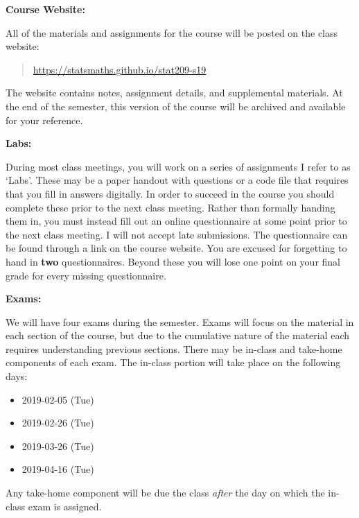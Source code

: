 \documentclass[12pt]{article}
\begin{document}
\bigskip

\textbf{Course Website:} \vspace{6pt}

All of the materials and assignments for the course will be posted
on the class website:
\begin{quote}
\url{https://statsmaths.github.io/stat209-s19}
\end{quote}
The website contains notes, assignment details, and supplemental materials.
At the end of the semester, this version of the course will be archived and
available for your reference.

\vspace{0.4cm}

\textbf{Labs:} \vspace{6pt}

During most class meetings, you will work on a series of assignments I refer
to as `Labs'. These may be a paper handout with questions or a code file that
requires that you fill in answers digitally. In order to succeed in the course
you should complete these prior to the next class meeting. Rather than
formally handing them in, you must instead fill out an online questionnaire
at some point prior to the next class meeting. I will not accept late
submissions. The questionnaire can be found through a link on the course
website. You are excused for forgetting to hand in \textbf{two}
questionnaires. Beyond these you will lose one point on your final grade for
every missing questionnaire.

\vspace{0.4cm}

\textbf{Exams:} \vspace{6pt}

We will have four exams during the semester. Exams will focus on
the material in each section of the course, but due to the cumulative nature
of the material each requires understanding previous sections. There may be
in-class and take-home components of each exam. The in-class portion will take
place on the following days:

\begin{itemize}\setlength\itemsep{0em}
\item 2019-02-05 (Tue)
\item 2019-02-26 (Tue)
\item 2019-03-26 (Tue)
\item 2019-04-16 (Tue)
\end{itemize}

Any take-home component will be due the class \textit{after} the day on which
the in-class exam is assigned.
\end{document}
